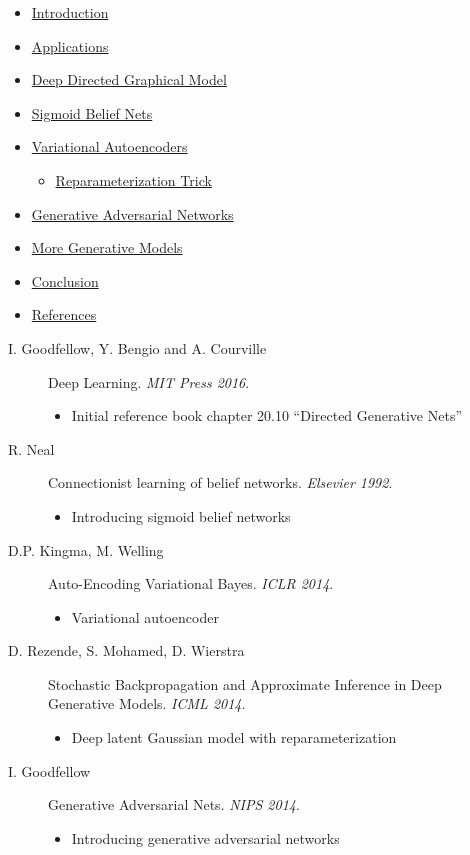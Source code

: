 \documentclass[11pt, a4paper, landscape]{article}
\begin{document}
\TitlePage


\NewPage{}
\vfill
\begin{itemize}
  \item \hyperlink{sli:introduction}{Introduction}
  \item \hyperlink{sli:applications}{Applications}
  \item \hyperlink{sli:graphicalmodel}{Deep Directed Graphical Model}
  \item \hyperlink{sli:sbn}{Sigmoid Belief Nets}
  \item \hyperlink{sli:vae}{Variational Autoencoders}
  \begin{itemize}
    \item \hyperlink{sli:reptrick}{Reparameterization Trick}
  \end{itemize}
  \item \hyperlink{sli:gan}{Generative Adversarial Networks}
  \item \hyperlink{sli:more}{More Generative Models}
  \item \hyperlink{sli:conclusion}{Conclusion}
  \item \hyperlink{sli:references}{References}
\end{itemize}
\vfill




\NewPage{}
\vfill
\begin{description}
  \item [I. Goodfellow, Y. Bengio and A. Courville] Deep Learning. {\em MIT Press 2016}.
	\begin{itemize}
    \item Initial reference book chapter 20.10 ``Directed Generative Nets''
	\end{itemize}
	\item [R. Neal] Connectionist learning of belief networks. {\em Elsevier 1992}.
	\begin{itemize}
		\item Introducing sigmoid belief networks
	\end{itemize}
	\item [D.P. Kingma, M. Welling] Auto-Encoding Variational Bayes. {\em ICLR 2014}.
	\begin{itemize}
		\item Variational autoencoder
	\end{itemize}
	\item [D. Rezende, S. Mohamed, D. Wierstra] Stochastic Backpropagation and Approximate Inference in Deep Generative Models. {\em ICML 2014}.
	\begin{itemize}
		\item Deep latent Gaussian model with reparameterization
	\end{itemize}
	\item [I. Goodfellow] Generative Adversarial Nets. {\em NIPS 2014}.
	\begin{itemize}
		\item Introducing generative adversarial networks
	\end{itemize}
\end{description}
\vfill
\end{document}
